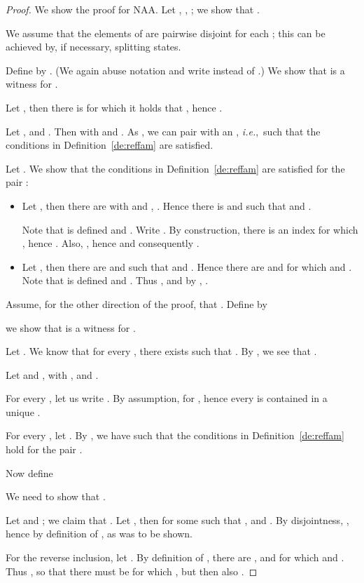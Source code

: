 \documentclass[twocolumn]{svjour3-dummy}
\newcommand*\ie{\textit{i.e.},}
\newcommand*\NAA{NAA\xspace}
\begin{document}
\begin{proof}\quad We show the proof for \NAA.  Let  ,
  , ; we
  show that .

  We assume that the elements of  are pairwise disjoint
  for each ; this can be achieved by, if necessary,
  splitting states.

  Define  by .  (We again abuse notation and write
   instead of .)  We show that
   is a witness for .

  Let , then there is  for which it holds that , hence .

  Let ,  and .  Then 
  with  and .  As , we can pair  with an
  , \ie~such that the conditions in
  Definition~\ref{de:reffam} are satisfied.

  Let .  We show that the conditions in
  Definition~\ref{de:reffam} are satisfied for the pair :
  \begin{itemize}
  \item Let , then there are  with  and , .  Hence there is  and  such that  and
    .

    Note that  is defined and .  Write .  By construction, there is an index  for which
    , hence .  Also, , hence  and consequently .

  \item Let , then there are 
    and  such that  and .  Hence there are  and 
    for which  and .  Note that  is
    defined and .  Thus , and by , .
  \end{itemize}

  Assume, for the other direction of the proof, that .  Define  by
  
  we show that  is a witness for .

  Let .  We know that for every , there
  exists  such that .  By
  , we see
  that .

  Let  and ,
  with , and .

  For every , let us write .  By assumption,  for , hence every  is contained in a unique .

  For every , let .  By , we have  such that the
  conditions in Definition~\ref{de:reffam} hold for the pair .

  Now define
  
  We need to show that .

  Let  and ; we
  claim that .  Let , then 
  for some  such that ,  and .  By disjointness, , hence by definition of ,  as was
  to be shown.

  For the reverse inclusion, let .  By
  definition of , there are ,  and  for which  and .  Thus , so that
  there must be  for which , but then
  also .


\end{proof}
\end{document}

